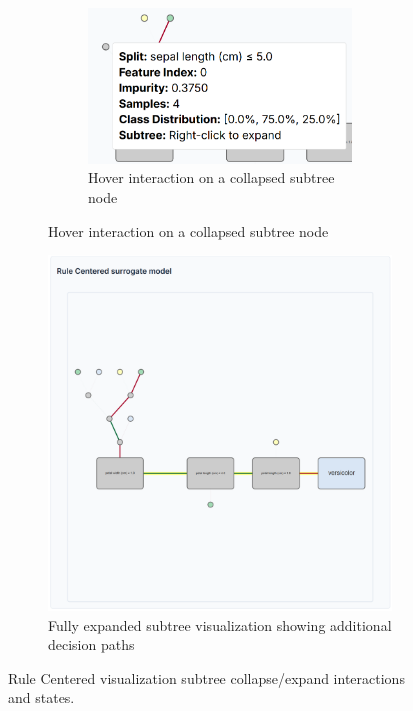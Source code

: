 \begin{figure}[ht!]
\begin{subfigure}[c]{0.28\textwidth}
        \begin{subfigure}[c]{\linewidth}
            \centering
            \includegraphics[width=\linewidth]{images/spawnDecisionTreeCollapsedHover.png}
            \caption{Hover interaction on a collapsed subtree node}
            \label{fig:spawnCollapsedHover}
        \end{subfigure}
    \end{subfigure}%
    \hfill
    \begin{subfigure}[c]{0.68\textwidth}
        \centering
        \includegraphics[width=\linewidth]{images/spawnDecisionTreeExpandedSubtree.png}
        \caption{Fully expanded subtree visualization showing additional decision paths}
        \label{fig:spawnExpandedSubtree}
    \end{subfigure}
    
    \caption{Rule Centered visualization subtree collapse/expand interactions and states.}
    \label{fig:spawnSubtreeInteractions}
\end{figure}

